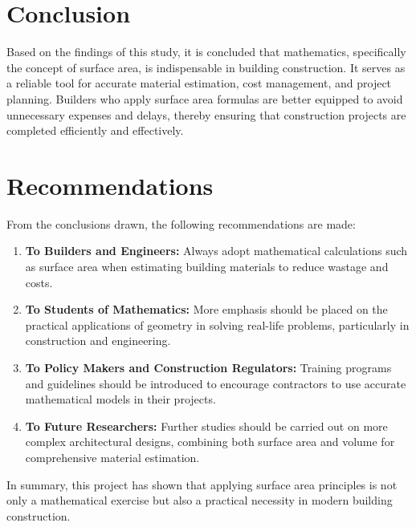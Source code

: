 \documentclass[12pt,a4paper,openany,titlepage,reqno, final]{report}
\theoremstyle{definition}
\begin{document}
	\section{Conclusion}
	Based on the findings of this study, it is concluded that mathematics, specifically the concept of surface area, is indispensable in building construction. It serves as a reliable tool for accurate material estimation, cost management, and project planning. Builders who apply surface area formulas are better equipped to avoid unnecessary expenses and delays, thereby ensuring that construction projects are completed efficiently and effectively.
	
	\section{Recommendations}
	From the conclusions drawn, the following recommendations are made:
	\begin{enumerate}
		\item \textbf{To Builders and Engineers:} Always adopt mathematical calculations such as surface area when estimating building materials to reduce wastage and costs.
		\item \textbf{To Students of Mathematics:} More emphasis should be placed on the practical applications of geometry in solving real-life problems, particularly in construction and engineering.
		\item \textbf{To Policy Makers and Construction Regulators:} Training programs and guidelines should be introduced to encourage contractors to use accurate mathematical models in their projects.
		\item \textbf{To Future Researchers:} Further studies should be carried out on more complex architectural designs, combining both surface area and volume for comprehensive material estimation.
	\end{enumerate}
	
	In summary, this project has shown that applying surface area principles is not only a mathematical exercise but also a practical necessity in modern building construction.
	
	
	
\end{document}
